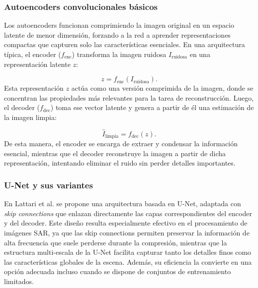 \subsubsection{Autoencoders convolucionales básicos}

Los autoencoders funcionan comprimiendo la imagen original en un espacio latente de menor dimensión, forzando a la red a aprender representaciones compactas que capturen solo las características esenciales. En una arquitectura típica, el encoder ($f_{\text{enc}}$) transforma la imagen ruidosa $I_{\text{ruidosa}}$ en una representación latente $z$:

\begin{equation}
	z = f_{\text{enc}}(I_{\text{ruidosa}}).
\end{equation}
Esta representación $z$ actúa como una versión comprimida de la imagen, donde se concentran las propiedades más relevantes para la tarea de reconstrucción. Luego, el decoder ($f_{\text{dec}}$) toma ese vector latente y genera a partir de él una estimación de la imagen limpia:

\begin{equation}
	\hat{I}_{\text{limpia}} = f_{\text{dec}}(z).
\end{equation}
De esta manera, el encoder se encarga de extraer y condensar la información esencial, mientras que el decoder reconstruye la imagen a partir de dicha representación, intentando eliminar el ruido sin perder detalles importantes.

\subsubsection{U-Net y sus variantes}

En Lattari et al. \cite{lattari2019deep} se propone una arquitectura basada en U-Net, adaptada con \emph{skip connections} que enlazan directamente las capas correspondientes del encoder y del decoder. Este diseño resulta especialmente efectivo en el procesamiento de imágenes SAR, ya que las skip connections permiten preservar la información de alta frecuencia que suele perderse durante la compresión, mientras que la estructura multi-escala de la U-Net facilita capturar tanto los detalles finos como las características globales de la escena. Además, su eficiencia la convierte en una opción adecuada incluso cuando se dispone de conjuntos de entrenamiento limitados.

